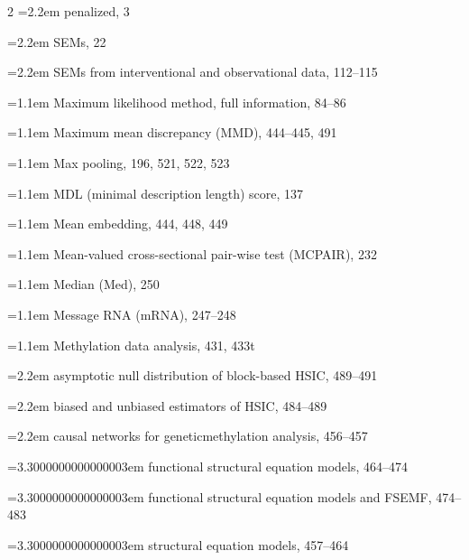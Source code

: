 \begin{multicols}{2}
\noindent\hangindent=2.2em \hspace*{1.1em}penalized, 3\par
\noindent\hangindent=2.2em \hspace*{1.1em}SEMs, 22\par
\noindent\hangindent=2.2em \hspace*{1.1em}SEMs from interventional and observational data, 112--115\par
\noindent\hangindent=1.1em Maximum likelihood method, full information, 84--86\par
\noindent\hangindent=1.1em Maximum mean discrepancy (MMD), 444--445, 491\par
\noindent\hangindent=1.1em Max pooling, 196, 521, 522, 523\par
\noindent\hangindent=1.1em MDL (minimal description length) score, 137\par
\noindent\hangindent=1.1em Mean embedding, 444, 448, 449\par
\noindent\hangindent=1.1em Mean-valued cross-sectional pair-wise test (MCPAIR), 232\par
\noindent\hangindent=1.1em Median (Med), 250\par
\noindent\hangindent=1.1em Message RNA (mRNA), 247--248\par
\noindent\hangindent=1.1em Methylation data analysis, 431, 433t\par
\noindent\hangindent=2.2em \hspace*{1.1em}asymptotic null distribution of block-based HSIC, 489--491\par
\noindent\hangindent=2.2em \hspace*{1.1em}biased and unbiased estimators of HSIC, 484--489\par
\noindent\hangindent=2.2em \hspace*{1.1em}causal networks for geneticmethylation analysis, 456--457\par
\noindent\hangindent=3.3000000000000003em \hspace*{2.2em}functional structural equation models, 464--474\par
\noindent\hangindent=3.3000000000000003em \hspace*{2.2em}functional structural equation models and FSEMF, 474--483\par
\noindent\hangindent=3.3000000000000003em \hspace*{2.2em}structural equation models, 457--464\par

\end{multicols}
